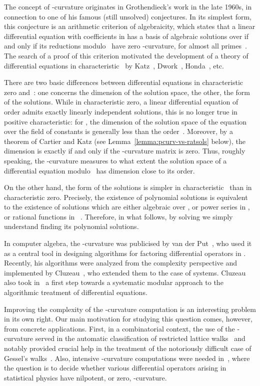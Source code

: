 \documentclass{sig-alternate}
\begin{document}
The concept of -curvature originates in Grothendieck's work in the
late 1960s, in connection to one of his famous (still unsolved)
conjectures. In its simplest form, this conjecture is an arithmetic
criterion of algebraicity, which states that a linear differential
equation with coefficients in  has a basis of algebraic
solutions over  if and only if its reductions
modulo~ have zero -curvature, for almost all primes~. The
search of a proof of this criterion motivated the development of a
theory of differential equations in characteristic~ by
Katz~\cite{Katz70}, Dwork~\cite{Dwork82}, Honda~\cite{Honda81}, etc.

There are two basic differences between differential equations in
characteristic zero and~: one concerns the dimension of the
solution space, the other, the form of the solutions. While in
characteristic zero, a linear differential equation of order 
admits exactly  linearly independent solutions, this is no longer
true in positive characteristic: for , the dimension of the solution space of the equation 
over the field of constants  is generally less than the
order~. Moreover, by a theorem of Cartier and Katz (see
Lemma~\ref{lemma:pcurv-vs-ratsols} below), the dimension is exactly
 if and only if the -curvature matrix  is zero. Thus,
roughly speaking, the -curvature measures to what extent the
solution space of a differential equation modulo~ has dimension
close to its order. 

On the other hand, the form of the solutions is simpler in
characteristic~ than in characteristic zero. Precisely, the
existence of polynomial solutions is equivalent to the existence of
solutions which are either algebraic over , or power series
in , or rational functions in ~\cite{Honda81}.
Therefore, in what follows, by solving  we simply understand
finding its polynomial solutions.

In computer algebra, the -curvature was publicised by van der
Put~\cite{vanDerPut95,vanDerPut96}, who used it as a central tool in
designing algorithms for factoring differential operators in
. Recently, his algorithms were
analyzed from the complexity perspective and implemented by
Cluzeau~\cite{Cluzeau03}, who extended them to the case of
systems. Cluzeau also took in~\cite{Cluzeau04} a first step towards a
systematic modular approach to the algorithmic treatment of
differential equations.

Improving the complexity of the -curvature computation is an
interesting problem in its own right. Our main motivation for studying
this question comes, however, from concrete applications. First, in a
combinatorial context, the use of the -curvature served in the
automatic classification of restricted lattice walks~\cite{BoKa08b}
and notably provided crucial help in the treatment of the notoriously
difficult case of Gessel's walks~\cite{BoKa08a}.  Also, intensive
-curvature computations were needed in~\cite{BBHMWZ08}, where the
question is to decide whether various differential operators arising
in statistical physics have nilpotent, or zero, -curvature. 
\end{document}
